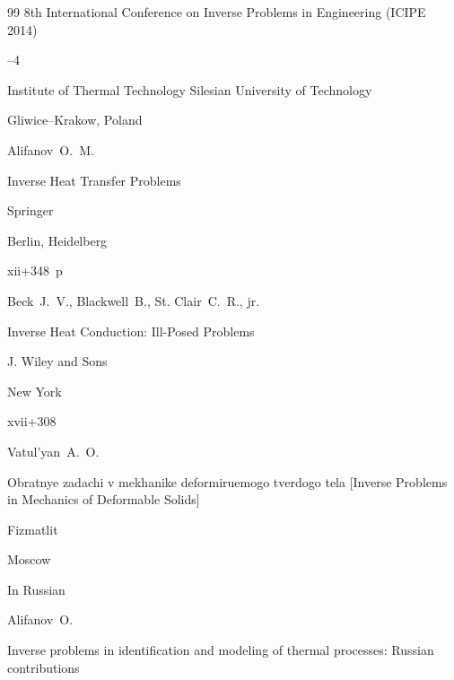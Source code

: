 \begin{thebibliography}{99}
\bookinfo 8th International Conference on Inverse Problems in Engineering (ICIPE 2014)


--4

\publ Institute of Thermal Technology Silesian University of Technology

\publaddr Gliwice--Krakow, Poland










\by Alifanov~O.~M.

\book Inverse Heat Transfer Problems


\publ Springer

\publaddr Berlin, Heidelberg

\totalpages xii+348~p \nofrills





\by Beck~J.~V., Blackwell~B., St. Clair~C.~R., jr.

\book Inverse Heat Conduction: Ill-Posed Problems


\publ J. Wiley and Sons

\publaddr New York

\totalpages xvii+308






\by Vatul'yan~A.~O.

\book Obratnye zadachi v mekhanike deformiruemogo tverdogo tela \rm [Inverse Problems in  Mechanics of Deformable Solids]


\publ Fizmatlit

\publaddr Moscow

\lang In Russian







\by Alifanov~O.

\paper Inverse problems in identification and modeling of thermal processes: Russian contributions


\end{thebibliography}
